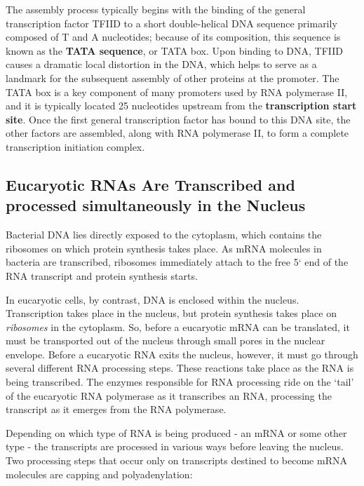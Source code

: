 The assembly process typically
begins with the binding of the general transcription factor TFIID to a short
double-helical DNA sequence primarily composed of T and A nucleotides;
because of its composition, this sequence is known as the \textbf{TATA sequence},
or TATA box. Upon binding to DNA, TFIID causes a dramatic local distortion in the DNA,
which helps to serve as a landmark for the
subsequent assembly of other proteins at the promoter. The TATA box is
a key component of many promoters used by RNA polymerase II, and it
is typically located 25 nucleotides upstream from the \textbf{transcription start
site}. Once the first general transcription factor has bound to this DNA site,
the other factors are assembled, along with RNA polymerase II, to form a
complete transcription initiation complex.


\subsection{Eucaryotic RNAs Are Transcribed and processed simultaneously in the Nucleus}

Bacterial DNA lies directly exposed to the cytoplasm,
which contains the ribosomes on which protein synthesis takes place.
As mRNA molecules in bacteria are transcribed, ribosomes immediately
attach to the free 5` end of the RNA transcript and protein synthesis
starts.

In eucaryotic cells, by contrast, DNA is enclosed within the nucleus.
Transcription takes place in the nucleus, but protein synthesis takes place
on \textit{ribosomes} in the cytoplasm. So, before a eucaryotic mRNA can be
translated, it must be transported out of the nucleus through small pores
in the nuclear envelope. Before a eucaryotic RNA exits the
nucleus, however, it must go through several different RNA processing
steps. These reactions take place as the RNA is being transcribed. The
enzymes responsible for RNA processing ride on the ‘tail’ of the eucaryotic
RNA polymerase as it transcribes an RNA, processing the transcript as
it emerges from the RNA polymerase.

Depending on which type of RNA is being produced - an mRNA or some
other type - the transcripts are processed in various ways before leaving
the nucleus. Two processing steps that occur only on transcripts destined
to become mRNA molecules are capping and polyadenylation:

